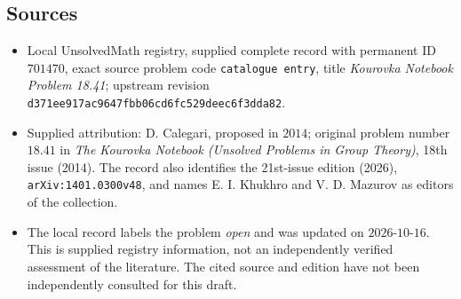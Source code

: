 \documentclass[11pt]{article}
\begin{document}
\subsection{Sources}
\begin{itemize}
\item Local UnsolvedMath registry, supplied complete record with permanent ID \(701470\), exact source problem code \texttt{catalogue entry}, title \emph{Kourovka Notebook Problem 18.41}; upstream revision \texttt{d371ee917ac9647fbb06cd6fc529deec6f3dda82}.
\item Supplied attribution: D. Calegari, proposed in \(2014\); original problem number \(18.41\) in \emph{The Kourovka Notebook (Unsolved Problems in Group Theory)}, 18th issue (2014). The record also identifies the 21st-issue edition (2026), \texttt{arXiv:1401.0300v48}, and names E. I. Khukhro and V. D. Mazurov as editors of the collection.
\item The local record labels the problem \emph{open} and was updated on \(2026\text{-}10\text{-}16\). This is supplied registry information, not an independently verified assessment of the literature. The cited source and edition have not been independently consulted for this draft.
\end{itemize}
\end{document}
